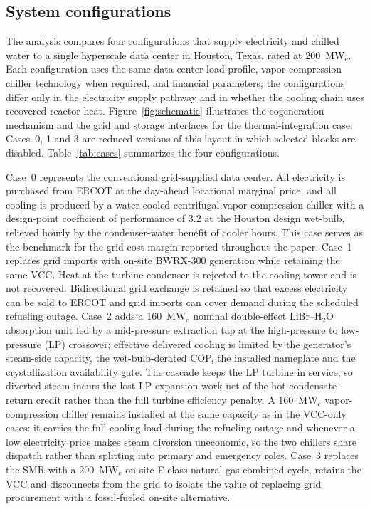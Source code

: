 \documentclass[sn-vancouver,Numbered]{sn-jnl}%
\begin{document}
\subsection{System configurations}
\label{sec:methods:system}

The analysis compares four configurations that supply electricity and chilled water to a single hyperscale data center in Houston, Texas, rated at 200~MW$_\mathrm{e}$. Each configuration uses the same data-center load profile, vapor-compression chiller technology when required, and financial parameters; the configurations differ only in the electricity supply pathway and in whether the cooling chain uses recovered reactor heat. Figure~\ref{fig:schematic} illustrates the cogeneration mechanism and the grid and storage interfaces for the thermal-integration case. Cases~0, 1 and 3 are reduced versions of this layout in which selected blocks are disabled. Table~\ref{tab:cases} summarizes the four configurations.

Case~0 represents the conventional grid-supplied data center. All electricity is purchased from ERCOT at the day-ahead locational marginal price, and all cooling is produced by a water-cooled centrifugal vapor-compression chiller with a design-point coefficient of performance of 3.2 at the Houston design wet-bulb, relieved hourly by the condenser-water benefit of cooler hours. This case serves as the benchmark for the grid-cost margin reported throughout the paper. Case~1 replaces grid imports with on-site BWRX-300 generation while retaining the same VCC. Heat at the turbine condenser is rejected to the cooling tower and is not recovered. Bidirectional grid exchange is retained so that excess electricity can be sold to ERCOT and grid imports can cover demand during the scheduled refueling outage. Case~2 adds a 160~MW$_\mathrm{c}$ nominal double-effect LiBr--H$_2$O absorption unit fed by a mid-pressure extraction tap at the high-pressure to low-pressure (LP) crossover; effective delivered cooling is limited by the generator's steam-side capacity, the wet-bulb-derated COP, the installed nameplate and the crystallization availability gate. The cascade keeps the LP turbine in service, so diverted steam incurs the lost LP expansion work net of the hot-condensate-return credit rather than the full turbine efficiency penalty. A 160~MW$_\mathrm{c}$ vapor-compression chiller remains installed at the same capacity as in the VCC-only cases: it carries the full cooling load during the refueling outage and whenever a low electricity price makes steam diversion uneconomic, so the two chillers share dispatch rather than splitting into primary and emergency roles. Case~3 replaces the SMR with a 200~MW$_\mathrm{e}$ on-site F-class natural gas combined cycle, retains the VCC and disconnects from the grid to isolate the value of replacing grid procurement with a fossil-fueled on-site alternative.
\end{document}
